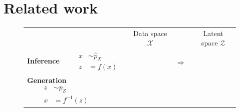 \documentclass{article}
\def\X{{\mathcal{X}}}
\def\Z{{\mathcal{Z}}}
\begin{document}
\section{Related work}
\begin{figure}
\begin{center}
{\renewcommand{\arraystretch}{2}
\begin{tabular}{m{1.25in}ccc}
& Data space $\X$ & & Latent space $\Z$
\\
\parbox{1.25in}{
\textbf{Inference}
$\begin{aligned}
\qquad x &\sim \hat{p}_{X} &\\
\qquad z &= f\left(x\right)
\end{aligned}$
}
&
&
\parbox{.25in}{
$\begin{aligned}
\Rightarrow
\end{aligned}$
}
&
\\[0.5in] %
\parbox{1.25in}{
\textbf{Generation}
$\begin{aligned}
\qquad z &\sim p_{Z} &
\\
\qquad x &= f^{-1}\left(z\right)
\end{aligned}$
}
 &
&
\parbox{.25in}{
}
\end{tabular}}
\end{center}
\end{figure}
\end{document}
